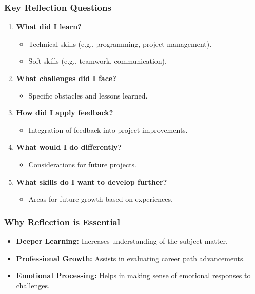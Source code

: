 \documentclass[aspectratio=169]{beamer}
\begin{document}
\begin{frame}[fragile]
    \frametitle{Key Reflection Questions}
    \begin{enumerate}
        \item \textbf{What did I learn?}
            \begin{itemize}
                \item Technical skills (e.g., programming, project management).
                \item Soft skills (e.g., teamwork, communication).
            \end{itemize}
        \item \textbf{What challenges did I face?}
            \begin{itemize}
                \item Specific obstacles and lessons learned.
            \end{itemize}
        \item \textbf{How did I apply feedback?}
            \begin{itemize}
                \item Integration of feedback into project improvements.
            \end{itemize}
        \item \textbf{What would I do differently?}
            \begin{itemize}
                \item Considerations for future projects.
            \end{itemize}
        \item \textbf{What skills do I want to develop further?}
            \begin{itemize}
                \item Areas for future growth based on experiences.
            \end{itemize}
    \end{enumerate}
\end{frame}

\begin{frame}[fragile]
    \frametitle{Why Reflection is Essential}
    \begin{itemize}
        \item \textbf{Deeper Learning:} Increases understanding of the subject matter.
        \item \textbf{Professional Growth:} Assists in evaluating career path advancements. 
        \item \textbf{Emotional Processing:} Helps in making sense of emotional responses to challenges.
    \end{itemize}
\end{frame}
\end{document}

